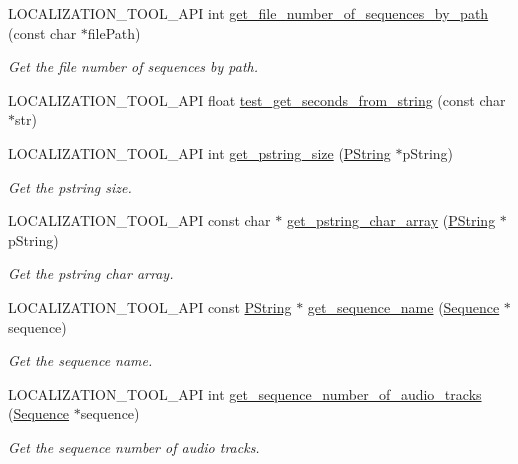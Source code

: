 \begin{DoxyCompactItemize}
L\+O\+C\+A\+L\+I\+Z\+A\+T\+I\+O\+N\+\_\+\+T\+O\+O\+L\+\_\+\+A\+PI int \mbox{\hyperlink{namespaceprz_aea902bbb73266b76bd53325b0c23da4c}{get\+\_\+file\+\_\+number\+\_\+of\+\_\+sequences\+\_\+by\+\_\+path}} (const char $\ast$file\+Path)
\begin{DoxyCompactList}\small\item\em Get the file number of sequences by path. \end{DoxyCompactList}\item 
L\+O\+C\+A\+L\+I\+Z\+A\+T\+I\+O\+N\+\_\+\+T\+O\+O\+L\+\_\+\+A\+PI float \mbox{\hyperlink{namespaceprz_aaac44f3182371ce344cce0720e1b823a}{test\+\_\+get\+\_\+seconds\+\_\+from\+\_\+string}} (const char $\ast$str)
\item 
L\+O\+C\+A\+L\+I\+Z\+A\+T\+I\+O\+N\+\_\+\+T\+O\+O\+L\+\_\+\+A\+PI int \mbox{\hyperlink{namespaceprz_abcd7a4fe2b50f3789b630197ee8cc378}{get\+\_\+pstring\+\_\+size}} (\mbox{\hyperlink{classprz_1_1_p_string}{P\+String}} $\ast$p\+String)
\begin{DoxyCompactList}\small\item\em Get the pstring size. \end{DoxyCompactList}\item 
L\+O\+C\+A\+L\+I\+Z\+A\+T\+I\+O\+N\+\_\+\+T\+O\+O\+L\+\_\+\+A\+PI const char $\ast$ \mbox{\hyperlink{namespaceprz_ada727f31dec00b46eaf85d040dc0641c}{get\+\_\+pstring\+\_\+char\+\_\+array}} (\mbox{\hyperlink{classprz_1_1_p_string}{P\+String}} $\ast$p\+String)
\begin{DoxyCompactList}\small\item\em Get the pstring char array. \end{DoxyCompactList}\item 
L\+O\+C\+A\+L\+I\+Z\+A\+T\+I\+O\+N\+\_\+\+T\+O\+O\+L\+\_\+\+A\+PI const \mbox{\hyperlink{classprz_1_1_p_string}{P\+String}} $\ast$ \mbox{\hyperlink{namespaceprz_a330a844981433fc9a6bb57a32bcdc7d4}{get\+\_\+sequence\+\_\+name}} (\mbox{\hyperlink{classprz_1_1_sequence}{Sequence}} $\ast$sequence)
\begin{DoxyCompactList}\small\item\em Get the sequence name. \end{DoxyCompactList}\item 
L\+O\+C\+A\+L\+I\+Z\+A\+T\+I\+O\+N\+\_\+\+T\+O\+O\+L\+\_\+\+A\+PI int \mbox{\hyperlink{namespaceprz_a261fb90bd1c2cd3d75ceea90968338ed}{get\+\_\+sequence\+\_\+number\+\_\+of\+\_\+audio\+\_\+tracks}} (\mbox{\hyperlink{classprz_1_1_sequence}{Sequence}} $\ast$sequence)
\begin{DoxyCompactList}\small\item\em Get the sequence number of audio tracks. \end{DoxyCompactList}\item 

\end{DoxyCompactItemize}
